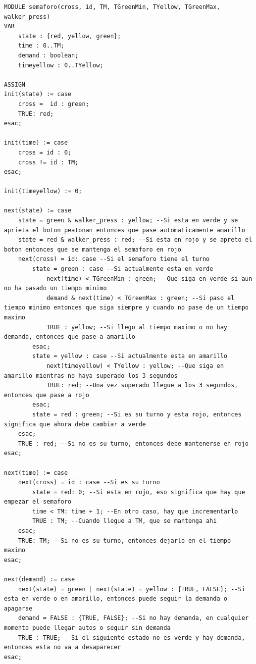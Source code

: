 \begin{lstlisting}[language=NuSMV, caption={Modelo con botón peatonal}]
MODULE semaforo(cross, id, TM, TGreenMin, TYellow, TGreenMax, walker_press)
VAR
    state : {red, yellow, green};
    time : 0..TM;
    demand : boolean;
    timeyellow : 0..TYellow;

ASSIGN
init(state) := case
    cross =  id : green;
    TRUE: red;
esac;

init(time) := case
    cross = id : 0;
    cross != id : TM;
esac;

init(timeyellow) := 0;

next(state) := case
    state = green & walker_press : yellow; --Si esta en verde y se aprieta el boton peatonan entonces que pase automaticamente amarillo
    state = red & walker_press : red; --Si esta en rojo y se apreto el boton entonces que se mantenga el semaforo en rojo
    next(cross) = id: case --Si el semaforo tiene el turno
        state = green : case --Si actualmente esta en verde
            next(time) < TGreenMin : green; --Que siga en verde si aun no ha pasado un tiempo minimo
            demand & next(time) < TGreenMax : green; --Si paso el tiempo minimo entonces que siga siempre y cuando no pase de un tiempo maximo 
            TRUE : yellow; --Si llego al tiempo maximo o no hay demanda, entonces que pase a amarillo
        esac;
        state = yellow : case --Si actualmente esta en amarillo
            next(timeyellow) < TYellow : yellow; --Que siga en amarillo mientras no haya superado los 3 segundos
            TRUE: red; --Una vez superado llegue a los 3 segundos, entonces que pase a rojo
        esac;
        state = red : green; --Si es su turno y esta rojo, entonces significa que ahora debe cambiar a verde
    esac;
    TRUE : red; --Si no es su turno, entonces debe mantenerse en rojo
esac;

next(time) := case
    next(cross) = id : case --Si es su turno
        state = red: 0; --Si esta en rojo, eso significa que hay que empezar el semaforo
        time < TM: time + 1; --En otro caso, hay que incrementarlo
        TRUE : TM; --Cuando llegue a TM, que se mantenga ahi
    esac;
    TRUE: TM; --Si no es su turno, entonces dejarlo en el tiempo maximo
esac;

next(demand) := case 
    next(state) = green | next(state) = yellow : {TRUE, FALSE}; --Si esta en verde o en amarillo, entonces puede seguir la demanda o apagarse
    demand = FALSE : {TRUE, FALSE}; --Si no hay demanda, en cualquier momento puede llegar autos o seguir sin demanda
    TRUE : TRUE; --Si el siguiente estado no es verde y hay demanda, entonces esta no va a desaparecer
esac;


\end{lstlisting}

